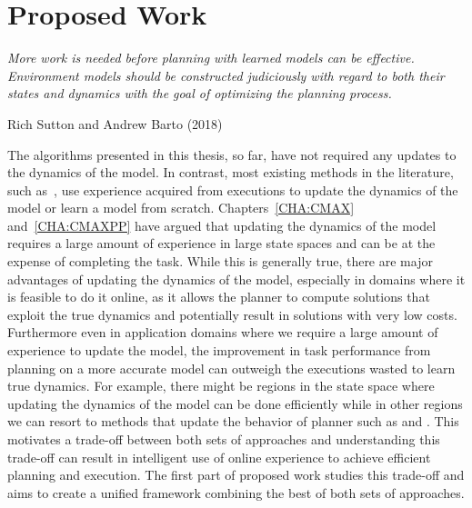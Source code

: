 \chapter{Proposed Work}
\label{cha:proposed-work}

\epigraph{\textit{More work is needed before planning with learned
    models can be effective. Environment models should be
    constructed judiciously with regard to both their states and
    dynamics with the goal of optimizing the planning process.}}{Rich
  Sutton and Andrew Barto (2018)}

The algorithms presented in this thesis, so
far, have not required any updates to the dynamics of the model. In
contrast, most existing methods in the literature, such
as~\cite{DBLP:journals/ml/KearnsS02, DBLP:journals/jmlr/BrafmanT02,
  DBLP:conf/atal/JongS07, 
  DBLP:journals/pami/DeisenrothFR15, DBLP:conf/icml/AbbeelQN06, 
  DBLP:conf/aaai/Jiang18, rastogi2018sample}, use experience
acquired from executions to update the dynamics of the model or learn
a model from scratch.
Chapters~\ref{CHA:CMAX} and~\ref{CHA:CMAXPP} have
argued that updating the dynamics of the model requires a large amount
of experience in large state spaces and can be at the expense of
completing the task. While this is generally true, there are major
advantages of updating the dynamics of the model, especially in
domains where it 
is feasible to do it online, as it allows the planner to compute
solutions that exploit the true dynamics and potentially result in
solutions with very low costs. Furthermore even in application domains
where we require a large amount of experience to update the model,
the improvement in task performance from planning on a more accurate
model can outweigh the executions wasted to learn true dynamics. For
example, there might be regions in the state space where updating the
dynamics of the model can be done efficiently while in other regions
we can resort to methods that update the behavior of planner such as
\cmax{} and \cmaxpp{}. This motivates a trade-off between both sets of
approaches and understanding this trade-off can result in intelligent
use of online experience to achieve efficient planning and
execution. The first part of proposed work studies this trade-off
and aims to create a unified framework combining the best of both
sets of approaches.

